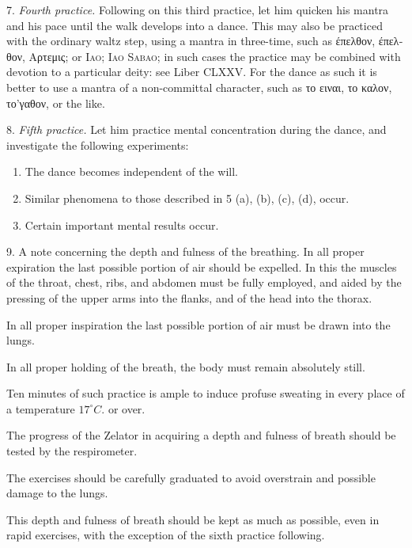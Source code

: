 7. \textit{Fourth practice.} Following on this third practice, let him quicken his mantra and his pace until the walk develops into a dance. This may also be practiced with the ordinary waltz step, using a mantra in three-time, such as \textgreek{\'{ε}πελθον}, \textgreek{\'{ε}πελθον}, \textgreek{Αρτεμις}; or \textsc{Iao; Iao Sabao}; in such cases the practice may be combined with devotion to a particular deity: see Liber CLXXV. For the dance as such it is better to use a mantra of a non-committal character, such as \textgreek{το} \textgreek{ειναι}, \textgreek{το} \textgreek{καλον}, \textgreek{το’γαθον}, or the like.

8. \textit{Fifth practice.} Let him practice mental concentration during the dance, and investigate the following experiments:

\begin{enumerate}[label=(\alph*)]
\item The dance becomes independent of the will.
\item Similar phenomena to those described in 5 (a), (b), (c), (d), occur.
\item Certain important mental results occur.
\end{enumerate}

9. A note concerning the depth and fulness of the breathing. In all proper expiration the last possible portion of air should be expelled. In this the muscles of the throat, chest, ribs, and abdomen must be fully employed, and aided by the pressing of the upper arms into the flanks, and of the head into the thorax.

In all proper inspiration the last possible portion of air must be drawn into the lungs.

In all proper holding of the breath, the body must remain absolutely still.

Ten minutes of such practice is ample to induce profuse sweating in every place of a temperature $17^{\circ}C.$ or over.

The progress of the Zelator in acquiring a depth and fulness of breath should be tested by the respirometer.

The exercises should be carefully graduated to avoid overstrain and possible damage to the lungs.

This depth and fulness of breath should be kept as much as possible, even in rapid exercises, with the exception of the sixth practice following.

